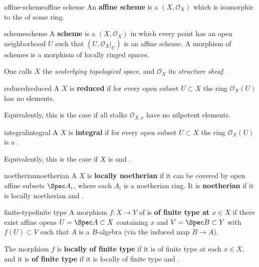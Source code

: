 \begin{topic}{affine-scheme}{affine scheme}
    An \textbf{affine scheme} is a  $(X, \mathcal{O}_X)$ which is isomorphic to the  of some ring.
\end{topic}

\begin{topic}{scheme}{scheme}
    A \textbf{scheme} is a  $(X, \mathcal{O}_X)$ in which every point has an open neighborhood $U$ such that $(U, \mathcal{O}_X|_U)$ is an affine scheme. A morphism of schemes is a morphism of locally ringed spaces.
    
    One calls $X$ the \textit{underlying topological space}, and $\mathcal{O}_X$ its \textit{structure sheaf}.
\end{topic}

\begin{topic}{reduced}{reduced}
    A  $X$ is \textbf{reduced} if for every open subset $U \subset X$ the ring $\mathcal{O}_X(U)$ has no  elements.
    
    Equivalently, this is the case if all stalks $\mathcal{O}_{X, x}$ have no nilpotent elements.
\end{topic}

\begin{topic}{integral}{integral}
    A  $X$ is \textbf{integral} if for every open subset $U \subset X$ the ring $\mathcal{O}_X(U)$ is a .
    
    Equivalently, this is the case if $X$ is  and .
\end{topic}

\begin{topic}{noetherian}{noetherian}
    A  $X$ is \textbf{locally noetherian} if it can be covered by open affine subsets $\Spec A_i$, where each $A_i$ is a noetherian ring. It is \textbf{noetherian} if it is locally noetherian and .
\end{topic}

\begin{topic}{finite-type}{finite type}
    A morphism $f : X \to Y$ of  is \textbf{of finite type at $x \in X$} if there exist affine opens $U = \Spec A \subset X$ containing $x$ and $V = \Spec B \subset Y$ with $f(U) \subset V$ such that $A$ is a  $B$-algebra (via the induced map $B \to A$).
    
    The morphism $f$ is \textbf{locally of finite type} if it is of finite type at each $x \in X$, and it is \textbf{of finite type} if it is locally of finite type and .
\end{topic}

